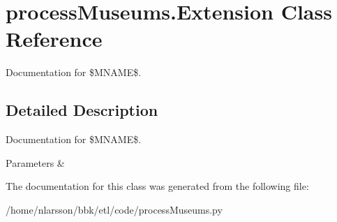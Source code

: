 \hypertarget{classprocessMuseums_1_1Extension}{}\section{process\+Museums.\+Extension Class Reference}
\label{classprocessMuseums_1_1Extension}


Documentation for \$\+M\+N\+A\+ME\$.  




\subsection{Detailed Description}
Documentation for \$\+M\+N\+A\+ME\$. 


\begin{DoxyParams}{Parameters}
{\em } & \\
\hline
\end{DoxyParams}


The documentation for this class was generated from the following file\+:\begin{DoxyCompactItemize}
\item 
/home/nlarsson/bbk/etl/code/process\+Museums.\+py\end{DoxyCompactItemize}
